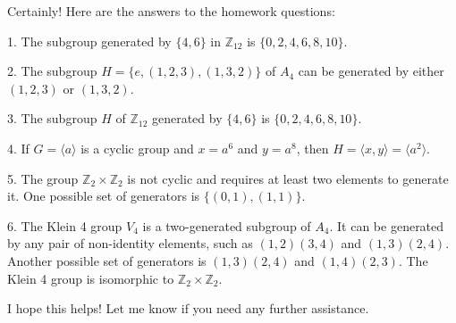 Certainly! Here are the answers to the homework questions:

1. The subgroup generated by $\{4, 6\}$ in $\mathbb{Z}_{12}$ is $\{0, 2, 4, 6, 8, 10\}$.

2. The subgroup $H = \{e, (1,2,3), (1,3,2)\}$ of $A_4$ can be generated by either $(1,2,3)$ or $(1,3,2)$.

3. The subgroup $H$ of $\mathbb{Z}_{12}$ generated by $\{4, 6\}$ is $\{0, 2, 4, 6, 8, 10\}$.

4. If $G = \langle a \rangle$ is a cyclic group and $x = a^6$ and $y = a^8$, then $H = \langle x, y \rangle = \langle a^2 \rangle$.

5. The group $\mathbb{Z}_2 \times \mathbb{Z}_2$ is not cyclic and requires at least two elements to generate it. One possible set of generators is $\{(0,1), (1,1)\}$.

6. The Klein 4 group $V_4$ is a two-generated subgroup of $A_4$. It can be generated by any pair of non-identity elements, such as $(1,2)(3,4)$ and $(1,3)(2,4)$. Another possible set of generators is $(1,3)(2,4)$ and $(1,4)(2,3)$. The Klein 4 group is isomorphic to $\mathbb{Z}_2 \times \mathbb{Z}_2$.

I hope this helps! Let me know if you need any further assistance.